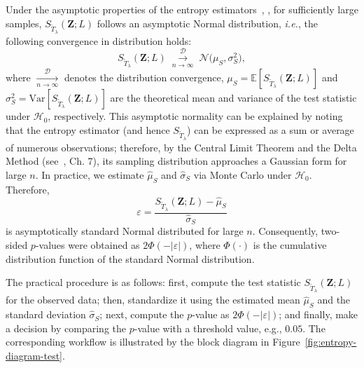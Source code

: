 \documentclass[
  lettersize  journal,
]{IEEEtran}%
\begin{document}
Under the asymptotic properties of the entropy
estimators~,
, for sufficiently large samples,
\(S_{\widetilde T_\lambda}(\bm{Z};L)\) follows an asymptotic Normal
distribution, \emph{i.e.}, the following convergence in distribution
holds: \[
  S_{\widetilde T_\lambda}(\bm Z;L)\;
  \overset{\mathcal{D}}{\underset{n \to \infty}{\longrightarrow}}\;
  \mathcal N\!\bigl(\mu_S,\sigma_S^{2}\bigr),
\] where \(\xrightarrow[n\rightarrow\infty]{\mathcal{D}}\) denotes the
distribution convergence,
\(\mu_S = \mathbb{E}[S_{\widetilde T_\lambda}(\bm{Z};L)]\) and
\(\sigma^2_S = \mathrm{Var}[S_{\widetilde T_\lambda}(\bm{Z};L)]\) are
the theoretical mean and variance of the test statistic under
\(\mathcal{H}_0\), respectively. This asymptotic normality can be
explained by noting that the entropy estimator (and hence
\(S_{\widetilde T_\lambda}\)) can be expressed as a sum or average of
numerous observations; therefore, by the Central Limit Theorem and the
Delta Method
(see~, Ch. 7), its
sampling distribution approaches a Gaussian form for large \(n\). In
practice, we estimate \(\widehat{\mu}_S\) and \(\widehat{\sigma}_S\) via
Monte Carlo under \(\mathcal{H}_0\). Therefore, \begin{equation*}
\varepsilon = \frac{{S_{\widetilde T_\lambda}(\bm{Z}; L) - \widehat{\mu}_S}}{{\widehat{\sigma}_S}}
\end{equation*} is asymptotically standard Normal distributed for large
\(n\). Consequently, two-sided \(p\)-values were obtained as
\(2\Phi(-|\varepsilon|)\), where \(\Phi(\cdot)\) is the cumulative
distribution function of the standard Normal distribution.

The practical procedure is as follows: first, compute the test statistic
\(S_{\widetilde T_\lambda}(\bm{Z}; L)\) for the observed data; then,
standardize it using the estimated mean \(\widehat{\mu}_S\) and the
standard deviation \(\widehat{\sigma}_S\); next, compute the \(p\)-value
as \(2\Phi(-|\varepsilon|)\); and finally, make a decision by comparing
the \(p\)-value with a threshold value, e.g., \(0.05\). The
corresponding workflow is illustrated by the block diagram in
Figure~\ref{fig:entropy-diagram-test}.
\end{document}
